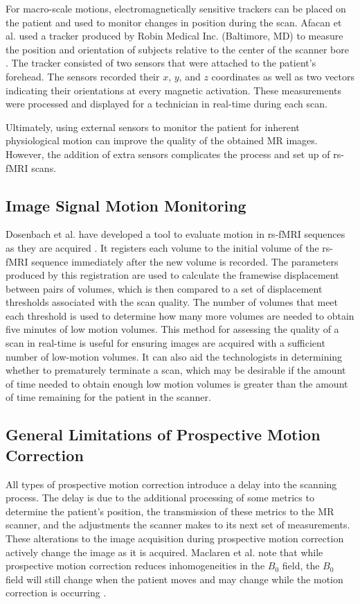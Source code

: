 For macro-scale motions, electromagnetically sensitive trackers can be placed on the patient and used to monitor changes in position during the scan. Afacan et al. used a tracker produced by Robin Medical Inc. (Baltimore, MD) to measure the position and orientation of subjects relative to the center of the scanner bore \cite{Afacan2016}. The tracker consisted of two sensors that were attached to the patient's forehead. The sensors recorded their $x$, $y$, and $z$ coordinates as well as two vectors indicating their orientations at every magnetic activation. These measurements were processed and displayed for a technician in real-time during each scan.

Ultimately, using external sensors to monitor the patient for inherent physiological motion can improve the quality of the obtained MR images. However, the addition of extra sensors complicates the process and set up of rs-fMRI scans.

\subsection{Image Signal Motion Monitoring}

Dosenbach et al. have developed a tool to evaluate motion in rs-fMRI sequences as they are acquired \cite{Dosenbach2017}. It registers each volume to the initial volume of the rs-fMRI sequence immediately after the new volume is recorded. The parameters produced by this registration are used to calculate the framewise displacement between pairs of volumes, which is then compared to a set of displacement thresholds associated with the scan quality. The number of volumes that meet each threshold is used to determine how many more volumes are needed to obtain five minutes of low motion volumes. This method for assessing the quality of a scan in real-time is useful for ensuring images are acquired with a sufficient number of low-motion volumes. It can also aid the technologists in determining whether to prematurely terminate a scan, which may be desirable if the amount of time needed to obtain enough low motion volumes is greater than the amount of time remaining for the patient in the scanner. 


\subsection{General Limitations of Prospective Motion Correction}

All types of prospective motion correction introduce a delay into the scanning process. The delay is due to the additional processing of some metrics to determine the patient's position, the transmission of these metrics to the MR scanner, and the adjustments the scanner makes to its next set of measurements. These alterations to the image acquisition during prospective motion correction actively change the image as it is acquired.
Maclaren et al. note that while prospective motion correction reduces inhomogeneities in the $B_0$ field, the $B_0$ field will still change when the patient moves and may change while the motion correction is occurring \cite{Maclaren2013}. %

